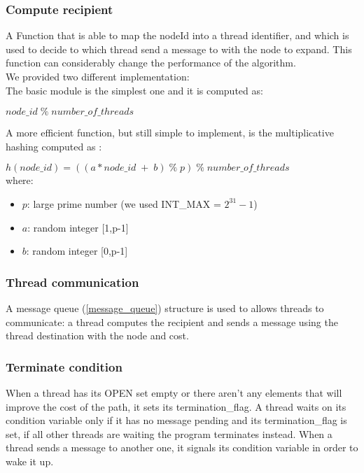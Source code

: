 \subsubsection{Compute recipient}
\label{compute_reci}

A Function that is able to map the nodeId into a thread identifier, and which is used to decide to which thread send a message to with the node to expand.
This function can considerably change the performance of the algorithm.
\\ 
We provided two different implementation:
\\
The basic module is the simplest one and it is computed as: \\
\begin{center}
    $node\_id \; \% \;  number\_of\_threads$
\end{center}

A more efficient function, but still simple to implement, is the multiplicative hashing computed as \cite{bibVideoMulHash}: \\
\begin{center}
    $ h(node\_id) =((a*node\_id \; + \; b) \; \% \; p) \; \% \; number\_of\_threads $  
    \\ 
    where:
    \begin{itemize}
        \item $p$: large prime number (we used INT\_MAX =  $ 2^{31}-1 $)
        \item $a$: random integer [1,p-1]
        \item $b$: random integer [0,p-1]
    \end{itemize}
\end{center}


\subsubsection{Thread communication}
\label{thread_buf}

A message queue (\ref{message_queue}) structure is used to allows threads to communicate: a thread computes the recipient and sends a message using the thread destination with the node and cost. 

\subsubsection{Terminate condition}
\label{terminate}

When a thread has its OPEN set empty or there aren't any elements that will improve the cost of the path, it sets its termination\_flag.
A thread waits on its condition variable only if it has no message pending and its termination\_flag is set, if all other threads are waiting the program terminates instead.
When a thread sends a message to another one, it signals its condition variable in order to wake it up.

